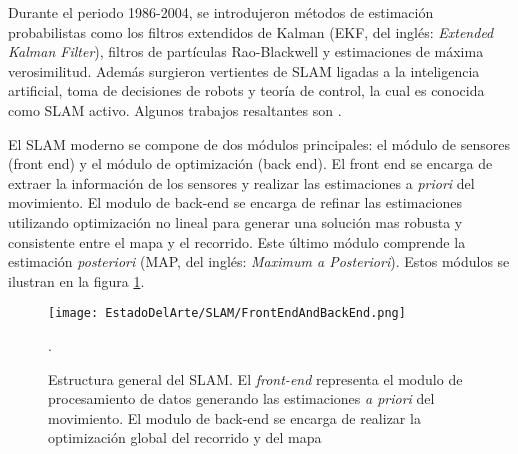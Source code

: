 Durante el periodo 1986-2004, se introdujeron métodos de estimación probabilistas  como los filtros extendidos de Kalman (EKF, del inglés: \textit{Extended Kalman Filter}), filtros de partículas Rao-Blackwell y estimaciones de máxima verosimilitud. Además surgieron vertientes de SLAM ligadas a la inteligencia artificial, toma de decisiones de robots y teoría de control, la cual es conocida como SLAM activo. Algunos trabajos resaltantes son \cite{Feder, Smith, Makarenko, Stachniss}.

El SLAM moderno se compone de dos módulos principales: el módulo de sensores (front end) y el módulo de optimización (back end). El front end se encarga de extraer la información de los sensores y realizar las estimaciones a \textit{priori} del movimiento. El modulo de back-end se encarga de refinar las estimaciones utilizando optimización no lineal para generar una solución mas robusta y consistente entre el mapa y el recorrido. Este último módulo comprende la estimación \textit{posteriori} (MAP, del inglés: \textit{Maximum a Posteriori}). Estos módulos se ilustran en la figura \ref{fig:SLAMStruct}.

\begin{figure}[H]
	\centering
	\texttt{[image: EstadoDelArte/SLAM/FrontEndAndBackEnd.png]}
	\caption[Estructura general del SLAM]{Estructura general del SLAM. El \textit{front-end} representa el modulo de procesamiento de datos generando las estimaciones \textit{a priori} del movimiento. El modulo de back-end se encarga de realizar la optimización global del recorrido y del mapa \cite{Cadena}}.
	\label{fig:SLAMStruct}
\end{figure}



